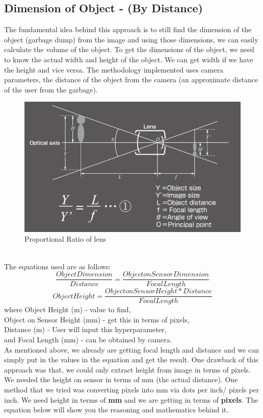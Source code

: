 \subsection{Dimension of Object - (By Distance)}
The fundamental idea behind this approach is to still find the dimension of the object (garbage dump) from the image and using those dimensions, we can easily calculate the volume of the object. To get the dimensions of the object, we need to know the actual width and height of the object. We can get width if we have the height and vice versa. The methodology implemented uses camera parameters, the distance of the object from the camera (an approximate distance of the user from the garbage). 
\begin{figure}
    \centering
    \includegraphics[scale=0.6]{images/dimensionDistance.png}
    \caption{Proportional Ratio of lens}
    \label{fig:lensRatio}
\end{figure}
\\
The equations used are as follows:
\begin{equation}
    \frac{Object Dimension}{Distance} = \frac{Object on Sensor Dimension}{Focal Length} 
\end{equation}
\begin{equation}
    Object Height = \frac{Object on Sensor Height * Distance}{Focal Length}
\end{equation}
where Object Height (m) - value to find,\\
Object on Sensor Height (mm) - get this in terms of pixels,\\
Distance (m) - User will input this hyperparameter,\\
and Focal Length (mm) - can be obtained by camera.\\
As mentioned above, we already are getting focal length and distance and we can simply put in the values in the equation and get the result. One drawback of this approach was that, we could only extract height from image in terms of pixels. We needed the height on sensor in terms of mm (the actual distance). One method that we tried was converting pixels into mm via dots per inch/ pixels per inch.  We need height in terms of \textbf{mm} and we are getting in terms of \textbf{pixels}. The equation below will show you the reasoning and mathematics behind it. 
